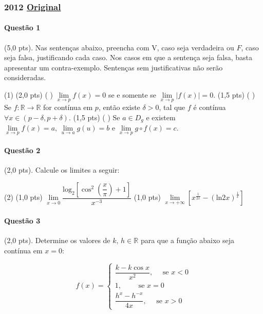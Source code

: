 \documentclass[12pt,a4paper]{article}
\newcommand{\R}{\mathbb{R}}
\newcommand{\original}[1]{\tiny \href{#1}{Original} \normalsize}
\begin{document}
\newpage

\subsubsection{2012  \original{https://drive.google.com/file/d/1thorAtniQglGnXdZSaHm4jAWuZ0GTwfN/view?usp=sharing}}

\paragraph{Questão 1} (5,0 pts). Nas sentenças abaixo, preencha com V, caso seja verdadeira ou $F$, caso seja falsa, justificando cada caso. Nos casos em que a sentença seja falsa, basta apresentar um contra-exemplo. Sentenças sem justificativas não serão consideradas.

\begin{tasks}(1)
\task (2,0 pts) ( \quad  ) $\lim\limits_{x\to p} f(x) = 0$ se e somente se $\lim\limits_{x\to p}\vert f(x) \vert = 0$.
\task (1,5 pts) ( \quad  ) Se $f: \R \to \R$ for contínua em $p$, então existe $\delta > 0$, tal que $f$ é contínua $\forall x \in (p - \delta,p+\delta)$.
\task (1,5 pts) ( \quad  ) Se $a \in D_g$ e existem $\lim\limits_{x\to p}f(x) = a,\, \lim\limits_{u\to a}g(u) = b$ e $\lim\limits_{x\to p}g \circ f(x) = c$.
\end{tasks}

\paragraph{Questão 2} (2,0 pts). Calcule os limites a seguir:
\begin{tasks}(2)
\task (1,0 pts) $\lim\limits_{x\to 0} \dfrac{\mathrm{log}_2 \left[\cos^2\left(\dfrac{x}{\pi}\right)+1\right]}{x^{-3}}$
\task (1,0 pts) $\lim\limits_{x\to +\infty} \left[x^{\frac{1}{2x}} - \left(\mathrm{ln} 2x \right)^{\frac{1}{x}} \right]$
\end{tasks}

\paragraph{Questão 3} (2,0 pts). Determine os valores de $k,\, h \in \R$ para que a função abaixo seja contínua em $x=0$:

$$f(x) = \begin{cases}\dfrac{k - k\cos{x}}{x^2},\quad \text{ se }x<0 \\ 1, \qquad \text{ se } x=0 \\ \dfrac{h^x - h^{-x}}{4x},\quad \text{ se } x>0 \end{cases}$$
\end{document}
